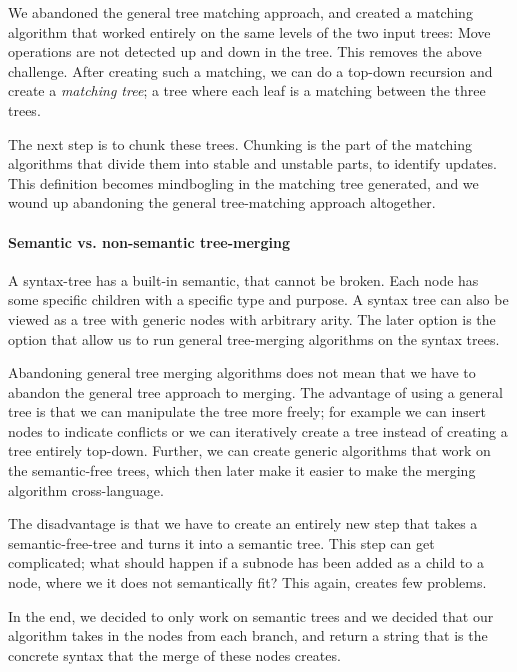 \documentclass[11pt]{article}
\begin{document}
We abandoned the general tree matching approach, and created a matching algorithm that worked entirely on the same levels of the two input trees: Move operations are not detected up and down in the tree. This removes the above challenge. After creating such a matching, we can do a top-down recursion and create a \textit{matching tree}; a tree where each leaf is a matching between the three trees. 

The next step is to chunk these trees. Chunking is the part of the matching algorithms that divide them into stable and unstable parts, to identify updates. This definition becomes mindbogling in the matching tree generated, and we wound up abandoning the general tree-matching approach altogether.
 
\paragraph{Semantic vs. non-semantic tree-merging} A syntax-tree has a built-in semantic, that cannot be broken. Each node has some specific children with a specific type and purpose. A syntax tree can also be viewed as a tree with generic nodes with arbitrary arity. The later option is the option that allow us to run general tree-merging algorithms on the syntax trees.

Abandoning general tree merging algorithms does not mean that we have to abandon the general tree approach to merging. The advantage of using a general tree is that we can manipulate the tree more freely; for example we can insert nodes to indicate conflicts or we can iteratively create a tree instead of creating a tree entirely top-down. Further, we can create generic algorithms that work on the semantic-free trees, which then later make it easier to make the merging algorithm cross-language.

The disadvantage is that we have to create an entirely new step that takes a semantic-free-tree and turns it into a semantic tree. This step can get complicated; what should happen if a subnode has been added as a child to a node, where we it does not semantically fit? This again, creates few problems.

In the end, we decided to only work on semantic trees and we decided that our algorithm takes in the nodes from each branch, and return a string that is the concrete syntax that the merge of these nodes creates.

\clearpage
\end{document}
